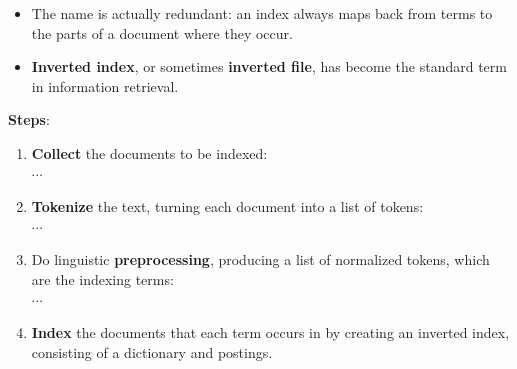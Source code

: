 \begin{itemize}
    \item The name is actually redundant: an index always maps back from terms to the parts of a document where they occur. 
    
    \item \textbf{Inverted index}, or sometimes \textbf{inverted file}, has become the standard term in information retrieval.    
\end{itemize}


\noindent \textbf{Steps}:
\begin{enumerate}
    \item \textbf{Collect} the documents to be indexed:\\
      $\cdots$

    \vspace{0.5cm}
    \item \textbf{Tokenize} the text, turning each document into a list of tokens:\\
             $\cdots$

    \vspace{0.5cm}
    \item Do linguistic \textbf{preprocessing}, producing a list of normalized tokens, which are the indexing terms:\\
        $\cdots$

    \vspace{0.5cm}
    \item \textbf{Index} the documents that each term occurs in by creating an inverted index, consisting of a dictionary and postings.
\end{enumerate}


